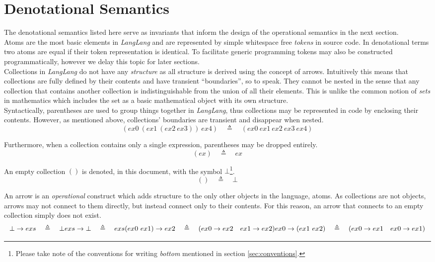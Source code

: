 \documentclass[a4paper,11pt]{article}
\begin{document}
\section{Denotational Semantics}

The denotational semantics listed here serve as invariants that inform the design of the operational semantics in the next section.\\

Atoms are the most basic elements in \textsl{LangLang} and are represented by simple whitespace free \emph{tokens} in source code.
In denotational terms two atoms are equal if their token representation is identical.
To facilitate generic programming tokens may also be constructed programmatically, however we delay this topic for later sections.\\

Collections in \textsl{LangLang} do not have any \emph{structure} as all structure is derived using the concept of arrows.
Intuitively this means that collections are fully defined by their contents and have transient ``boundaries'', so to speak.
They cannot be nested in the sense that any collection that contains another collection is indistinguishable from the union of all their elements.
This is unlike the common notion of \emph{sets} in mathematics which includes the set as a basic mathematical object with its own structure.\\

Syntactically, parentheses are used to group things together in \textsl{LangLang}, thus collections may be represented in code by enclosing their contents.
However, as mentioned above, collections' boundaries are transient and disappear when nested.
\[
(ex0\ (ex1\ (ex2\ ex3))\ ex4) \quad\triangleq\quad (ex0\ ex1\ ex2\ ex3\ ex4)
\]

Furthermore, when a collection contains only a single expression, parentheses may be dropped entirely.
\[
(ex) \quad\triangleq\quad ex
\]

An empty collection $()$ is denoted, in this document, with the symbol $\bot$\footnote{Please take note of the conventions for writing \emph{bottom} mentioned in section \ref{sec:conventions}.}.
\[
() \quad\triangleq\quad \bot
\]

An arrow is an \emph{operational} construct which adds structure to the only other objects in the language, atoms.
As collections are not objects, arrows may not connect to them directly, but instead connect only to their contents.
For this reason, an arrow that connects to an empty collection simply does not exist.
\[
\bot \rightarrow exs \quad\triangleq\quad \bot \\
exs \rightarrow \bot \quad\triangleq\quad exs \\
(ex0\ ex1) \rightarrow ex2 \quad\triangleq\quad (ex0 \rightarrow ex2 \quad ex1 \rightarrow ex2) \\
ex0 \rightarrow (ex1\ ex2) \quad\triangleq\quad (ex0 \rightarrow ex1 \quad ex0 \rightarrow ex1)
\]
\end{document}
